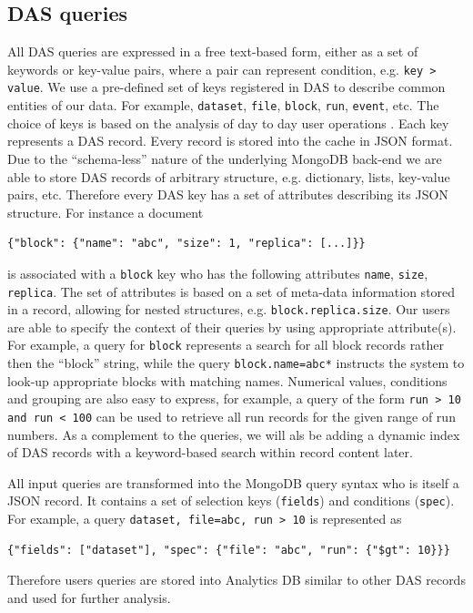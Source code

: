 \documentclass[1p,times]{elsarticle}
\begin{document}
\subsection{DAS queries}
All DAS queries are expressed in a free text-based form, either as a 
set of keywords or key-value pairs, where a pair can represent
condition, e.g. \verb+key > value+. We use a pre-defined set of keys registered 
in DAS to describe common entities of our data. For example, \verb+dataset+, 
\verb+file+, \verb+block+, \verb+run+, \verb+event+, etc. The choice of keys
is based on the analysis of day to day user operations \cite{DBS07}.
Each key represents a DAS record. Every record is stored into the cache
in JSON format. Due to the ``schema-less'' nature of the underlying MongoDB
back-end we are able to store DAS records of arbitrary structure, e.g.
dictionary, lists, key-value pairs, etc. Therefore every DAS key has a 
set of attributes describing its JSON structure. For instance a document
\begin{verbatim}
{"block": {"name": "abc", "size": 1, "replica": [...]}}
\end{verbatim}
is associated with a \verb+block+ key who has the following attributes
\verb+name+, \verb+size+, \verb+replica+. The set of attributes is based 
on a set of meta-data information stored in a record, allowing
for nested structures, e.g. \verb+block.replica.size+. Our users 
are able to specify the context of their queries by using appropriate 
attribute(s). For example, a query for \verb+block+ represents a search for all
block records rather then the ``block'' string, while the query
\verb+block.name=abc*+ instructs the system to look-up appropriate blocks
with matching names. Numerical values, conditions and grouping are
also easy to express, for example, a query
of the form \verb+run > 10 and run < 100+ can be used to
retrieve all run records for the given range of run numbers. 
As a complement to the queries, we will als be adding a dynamic index
of DAS records with a keyword-based search within record content later.

All input queries are transformed into the MongoDB query syntax who is itself
a JSON record. It contains a set of selection 
keys (\verb+fields+) and conditions (\verb+spec+). For example, a query
\verb+dataset, file=abc, run > 10+
is represented as
\begin{verbatim}
{"fields": ["dataset"], "spec": {"file": "abc", "run": {"$gt": 10}}}
\end{verbatim}
Therefore users queries are stored into Analytics DB similar to other DAS 
records and used for further analysis.
\end{document}
